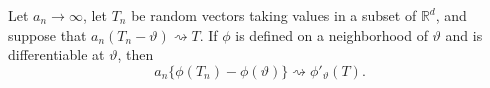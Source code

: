 Let \(a_n\to\infty\), let \(T_n\) be random vectors taking values in a subset of \(\mathbb R^d\), and suppose that \(a_n(T_n-\vartheta)\rightsquigarrow T\). If \(\phi\) is defined on a neighborhood of \(\vartheta\) and is differentiable at \(\vartheta\), then
\[
 a_n\{\phi(T_n)-\phi(\vartheta)\}\rightsquigarrow \phi'_{\vartheta}(T).
\]